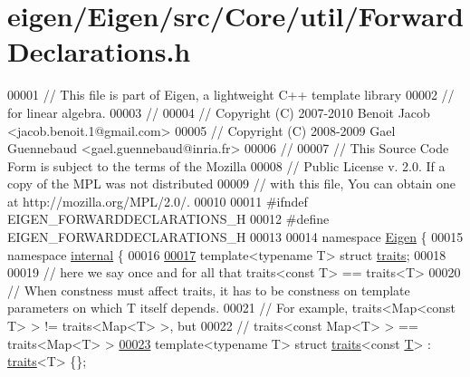 \hypertarget{eigen_2_eigen_2src_2_core_2util_2_forward_declarations_8h_source}{}\section{eigen/\+Eigen/src/\+Core/util/\+Forward\+Declarations.h}
\label{eigen_2_eigen_2src_2_core_2util_2_forward_declarations_8h_source}

\begin{DoxyCode}
00001 \textcolor{comment}{// This file is part of Eigen, a lightweight C++ template library}
00002 \textcolor{comment}{// for linear algebra.}
00003 \textcolor{comment}{//}
00004 \textcolor{comment}{// Copyright (C) 2007-2010 Benoit Jacob <jacob.benoit.1@gmail.com>}
00005 \textcolor{comment}{// Copyright (C) 2008-2009 Gael Guennebaud <gael.guennebaud@inria.fr>}
00006 \textcolor{comment}{//}
00007 \textcolor{comment}{// This Source Code Form is subject to the terms of the Mozilla}
00008 \textcolor{comment}{// Public License v. 2.0. If a copy of the MPL was not distributed}
00009 \textcolor{comment}{// with this file, You can obtain one at http://mozilla.org/MPL/2.0/.}
00010 
00011 \textcolor{preprocessor}{#ifndef EIGEN\_FORWARDDECLARATIONS\_H}
00012 \textcolor{preprocessor}{#define EIGEN\_FORWARDDECLARATIONS\_H}
00013 
00014 \textcolor{keyword}{namespace }\hyperlink{namespace_eigen}{Eigen} \{
00015 \textcolor{keyword}{namespace }\hyperlink{namespaceinternal}{internal} \{
00016 
\hyperlink{struct_eigen_1_1internal_1_1traits}{00017} \textcolor{keyword}{template}<\textcolor{keyword}{typename} T> \textcolor{keyword}{struct }\hyperlink{struct_eigen_1_1internal_1_1traits}{traits};
00018 
00019 \textcolor{comment}{// here we say once and for all that traits<const T> == traits<T>}
00020 \textcolor{comment}{// When constness must affect traits, it has to be constness on template parameters on which T itself
       depends.}
00021 \textcolor{comment}{// For example, traits<Map<const T> > != traits<Map<T> >, but}
00022 \textcolor{comment}{//              traits<const Map<T> > == traits<Map<T> >}
\hyperlink{struct_eigen_1_1internal_1_1traits_3_01const_01_t_01_4}{00023} \textcolor{keyword}{template}<\textcolor{keyword}{typename} T> \textcolor{keyword}{struct }\hyperlink{struct_eigen_1_1internal_1_1traits}{traits}<const \hyperlink{group___sparse_core___module}{T}> : \hyperlink{struct_eigen_1_1internal_1_1traits}{traits}<T> \{\};

\end{DoxyCode}
